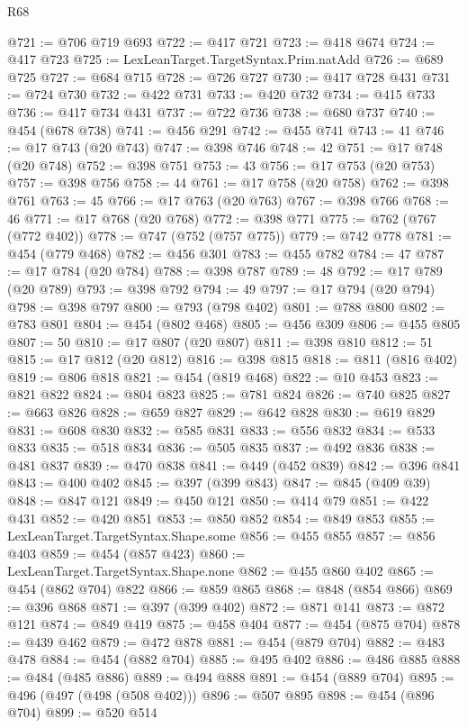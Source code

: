 \begin{lexlean}{R68}
\begin{coremodule}
@721 := @706 @719 @693
@722 := @417 @721
@723 := @418 @674
@724 := @417 @723
@725 := LexLeanTarget.TargetSyntax.Prim.natAdd
@726 := @689 @725
@727 := @684 @715
@728 := @726 @727
@730 := @417 @728 @431
@731 := @724 @730
@732 := @422 @731
@733 := @420 @732
@734 := @415 @733
@736 := @417 @734 @431
@737 := @722 @736
@738 := @680 @737
@740 := @454 (@678 @738)
@741 := @456 @291
@742 := @455 @741
@743 := 41
@746 := @17 @743 (@20 @743)
@747 := @398 @746
@748 := 42
@751 := @17 @748 (@20 @748)
@752 := @398 @751
@753 := 43
@756 := @17 @753 (@20 @753)
@757 := @398 @756
@758 := 44
@761 := @17 @758 (@20 @758)
@762 := @398 @761
@763 := 45
@766 := @17 @763 (@20 @763)
@767 := @398 @766
@768 := 46
@771 := @17 @768 (@20 @768)
@772 := @398 @771
@775 := @762 (@767 (@772 @402))
@778 := @747 (@752 (@757 @775))
@779 := @742 @778
@781 := @454 (@779 @468)
@782 := @456 @301
@783 := @455 @782
@784 := 47
@787 := @17 @784 (@20 @784)
@788 := @398 @787
@789 := 48
@792 := @17 @789 (@20 @789)
@793 := @398 @792
@794 := 49
@797 := @17 @794 (@20 @794)
@798 := @398 @797
@800 := @793 (@798 @402)
@801 := @788 @800
@802 := @783 @801
@804 := @454 (@802 @468)
@805 := @456 @309
@806 := @455 @805
@807 := 50
@810 := @17 @807 (@20 @807)
@811 := @398 @810
@812 := 51
@815 := @17 @812 (@20 @812)
@816 := @398 @815
@818 := @811 (@816 @402)
@819 := @806 @818
@821 := @454 (@819 @468)
@822 := @10 @453
@823 := @821 @822
@824 := @804 @823
@825 := @781 @824
@826 := @740 @825
@827 := @663 @826
@828 := @659 @827
@829 := @642 @828
@830 := @619 @829
@831 := @608 @830
@832 := @585 @831
@833 := @556 @832
@834 := @533 @833
@835 := @518 @834
@836 := @505 @835
@837 := @492 @836
@838 := @481 @837
@839 := @470 @838
@841 := @449 (@452 @839)
@842 := @396 @841
@843 := @400 @402
@845 := @397 (@399 @843)
@847 := @845 (@409 @39)
@848 := @847 @121
@849 := @450 @121
@850 := @414 @79
@851 := @422 @431
@852 := @420 @851
@853 := @850 @852
@854 := @849 @853
@855 := LexLeanTarget.TargetSyntax.Shape.some
@856 := @455 @855
@857 := @856 @403
@859 := @454 (@857 @423)
@860 := LexLeanTarget.TargetSyntax.Shape.none
@862 := @455 @860 @402
@865 := @454 (@862 @704) @822
@866 := @859 @865
@868 := @848 (@854 @866)
@869 := @396 @868
@871 := @397 (@399 @402)
@872 := @871 @141
@873 := @872 @121
@874 := @849 @419
@875 := @458 @404
@877 := @454 (@875 @704)
@878 := @439 @462
@879 := @472 @878
@881 := @454 (@879 @704)
@882 := @483 @478
@884 := @454 (@882 @704)
@885 := @495 @402
@886 := @486 @885
@888 := @484 (@485 @886)
@889 := @494 @888
@891 := @454 (@889 @704)
@895 := @496 (@497 (@498 (@508 @402)))
@896 := @507 @895
@898 := @454 (@896 @704)
@899 := @520 @514

\end{coremodule}
\end{lexlean}
